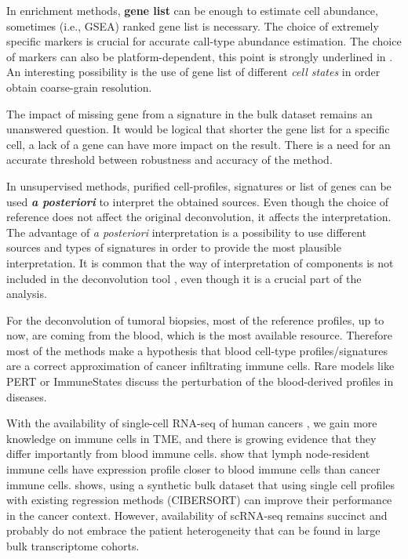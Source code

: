 \documentclass[12pt,]{book}
\theoremstyle{definition}
\theoremstyle{definition}
\theoremstyle{definition}
\theoremstyle{remark}
\begin{document}
In enrichment methods, \textbf{gene list} can be enough to estimate cell
abundance, sometimes (i.e., GSEA) ranked gene list is necessary. The
choice of extremely specific markers is crucial for accurate call-type
abundance estimation. The choice of markers can also be
platform-dependent, this point is strongly underlined in
\citep{Becht2016}. An interesting possibility is the use of gene list of
different \emph{cell states} in order obtain coarse-grain resolution.

The impact of missing gene from a signature in the bulk dataset remains
an unanswered question. It would be logical that shorter the gene list
for a specific cell, a lack of a gene can have more impact on the
result. There is a need for an accurate threshold between robustness and
accuracy of the method.

In unsupervised methods, purified cell-profiles, signatures or list of
genes can be used \emph{\textbf{a posteriori}} to interpret the obtained
sources. Even though the choice of reference does not affect the
original deconvolution, it affects the interpretation. The advantage of
\emph{a posteriori} interpretation is a possibility to use different
sources and types of signatures in order to provide the most plausible
interpretation. It is common that the way of interpretation of
components is not included in the deconvolution tool
\citep[\citet{Newberg2018}, \citet{Moffitt2015}]{Wang2016}, even though
it is a crucial part of the analysis.

For the deconvolution of tumoral biopsies, most of the reference
profiles, up to now, are coming from the blood, which is the most
available resource. Therefore most of the methods make a hypothesis that
blood cell-type profiles/signatures are a correct approximation of
cancer infiltrating immune cells. Rare models like PERT \citep{Qiao2012}
or ImmuneStates \citep{Vallania2017} discuss the perturbation of the
blood-derived profiles in diseases.

With the availability of single-cell RNA-seq of human cancers
\citep{Chung2017, Lavin2017, Li2017, Puram2017, Schelker2017, Tirosh2016, Zheng2017},
we gain more knowledge on immune cells in TME, and there is growing
evidence that they differ importantly from blood immune cells.
\citet{Racle2017} show that lymph node-resident immune cells have
expression profile closer to blood immune cells than cancer immune
cells. \citet{Schelker2017} shows, using a synthetic bulk dataset that
using single cell profiles with existing regression methods (CIBERSORT)
can improve their performance in the cancer context. However,
availability of scRNA-seq remains succinct and probably do not embrace
the patient heterogeneity that can be found in large bulk transcriptome
cohorts.
\end{document}
